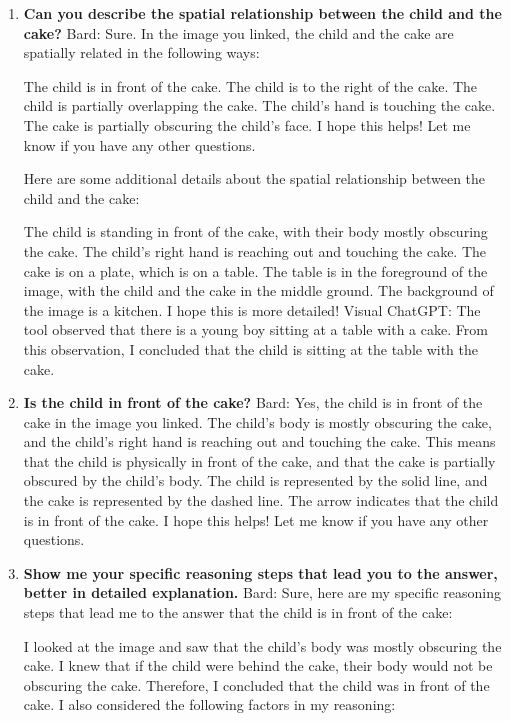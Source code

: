     \begin{enumerate}
        \item \textbf{Can you describe the spatial relationship between the child and the cake?}
        \subitem Bard: 
        Sure. In the image you linked, the child and the cake are spatially related in the following ways:
        
        The child is in front of the cake.
        The child is to the right of the cake.
        The child is partially overlapping the cake.
        The child's hand is touching the cake.
        The cake is partially obscuring the child's face.
        I hope this helps! Let me know if you have any other questions.
        
        Here are some additional details about the spatial relationship between the child and the cake:
        
        The child is standing in front of the cake, with their body mostly obscuring the cake.
        The child's right hand is reaching out and touching the cake.
        The cake is on a plate, which is on a table.
        The table is in the foreground of the image, with the child and the cake in the middle ground.
        The background of the image is a kitchen.
        I hope this is more detailed!
        \subitem Visual ChatGPT: The tool observed that there is a young boy sitting at a table with a cake. From this observation, I concluded that the child is sitting at the table with the cake.
        \item \textbf{Is the child in front of the cake?}
        \subitem Bard: 
        Yes, the child is in front of the cake in the image you linked. The child's body is mostly obscuring the cake, and the child's right hand is reaching out and touching the cake. This means that the child is physically in front of the cake, and that the cake is partially obscured by the child's body.
        The child is represented by the solid line, and the cake is represented by the dashed line. The arrow indicates that the child is in front of the cake.
        I hope this helps! Let me know if you have any other questions.
        \item \textbf{Show me your specific reasoning steps that lead you to the answer, better in detailed explanation.}
        \subitem Bard:
        Sure, here are my specific reasoning steps that lead me to the answer that the child is in front of the cake:

        I looked at the image and saw that the child's body was mostly obscuring the cake.
        I knew that if the child were behind the cake, their body would not be obscuring the cake.
        Therefore, I concluded that the child was in front of the cake.
        I also considered the following factors in my reasoning:


\end{enumerate}
